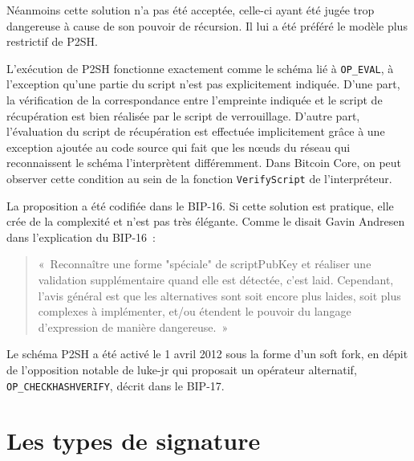 Néanmoins cette solution n'a pas été acceptée, celle-ci ayant été jugée trop dangereuse à cause de son pouvoir de récursion. Il lui a été préféré le modèle plus restrictif de P2SH.

L'exécution de P2SH fonctionne exactement comme le schéma lié à \texttt{OP\_EVAL}, à l'exception qu'une partie du script n'est pas explicitement indiquée. D'une part, la vérification de la correspondance entre l'empreinte indiquée et le script de récupération est bien réalisée par le script de verrouillage. D'autre part, l'évaluation du script de récupération est effectuée implicitement grâce à une exception ajoutée au code source qui fait que les nœuds du réseau qui reconnaissent le schéma l'interprètent différemment. Dans Bitcoin Core, on peut observer cette condition au sein de la fonction \texttt{VerifyScript} de l'interpréteur.

La proposition a été codifiée dans le BIP-16. Si cette solution est pratique, elle crée de la complexité et n'est pas très élégante. Comme le disait Gavin Andresen dans l'explication du BIP-16~:

\begin{quote}
«~Reconnaître une forme "spéciale" de scriptPubKey et réaliser une validation supplémentaire quand elle est détectée, c'est laid. Cependant, l'avis général est que les alternatives sont soit encore plus laides, soit plus complexes à implémenter, et/ou étendent le pouvoir du langage d'expression de manière dangereuse.~»
\end{quote}

Le schéma P2SH a été activé le 1\ier{} avril 2012 sous la forme d'un soft fork, en dépit de l'opposition notable de luke-jr qui proposait un opérateur alternatif, \texttt{OP\_CHECKHASHVERIFY}, décrit dans le BIP-17.

\section*{Les types de signature}


